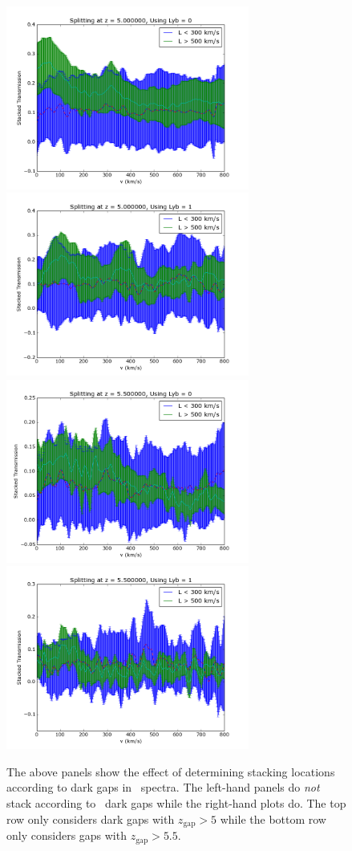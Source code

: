 \documentclass[11pt]{article}
\begin{document}
\begin{figure}[h]
  \centering
  \includegraphics[width=8cm]{LyaStack_wErrors_500kms.png}
  \includegraphics[width=8cm]{LybStack_wErrors_500kms.png}
  \includegraphics[width=8cm]{LyaStack_wErrors_500kms_z5p5.png}
  \includegraphics[width=8cm]{LybStack_wErrors_500kms_z5p5.png}
  \caption{The above panels show the effect of determining stacking locations according to dark gaps in \lyb\ spectra. The left-hand panels do \textit{not} stack according to \lyb\ dark gaps while the right-hand plots do. The top row only considers dark gaps with $z_{\text{gap}} > 5$ while the bottom row only considers gaps with $z_{\text{gap}} > 5.5$.}
  \label{fig:LybEffect}
\end{figure}
\end{document}
